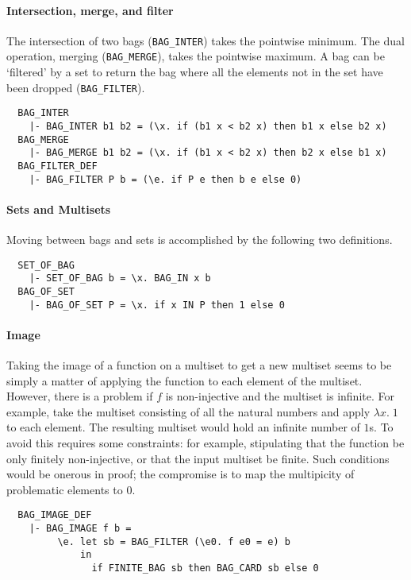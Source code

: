 \paragraph {Intersection, merge, and filter}

The intersection of two bags ({\small\verb+BAG_INTER+}) takes the
pointwise minimum. The dual operation, merging
({\small\verb+BAG_MERGE+}), takes the pointwise maximum. A bag can be
`filtered' by a set to return the bag where all the elements not in
the set have been dropped ({\small\verb+BAG_FILTER+}).
%
{\small
\begin{verbatim}
  BAG_INTER
    |- BAG_INTER b1 b2 = (\x. if (b1 x < b2 x) then b1 x else b2 x)
  BAG_MERGE
    |- BAG_MERGE b1 b2 = (\x. if (b1 x < b2 x) then b2 x else b1 x)
  BAG_FILTER_DEF
    |- BAG_FILTER P b = (\e. if P e then b e else 0)
\end{verbatim}}

\paragraph {Sets and Multisets}

Moving between bags and sets is accomplished by the following two
definitions.
%
{\small
\begin{verbatim}
  SET_OF_BAG
    |- SET_OF_BAG b = \x. BAG_IN x b
  BAG_OF_SET
    |- BAG_OF_SET P = \x. if x IN P then 1 else 0
\end{verbatim}}

\paragraph {Image}

Taking the image of a function on a multiset
to get a new multiset seems to be simply a
matter of applying the function to each element of the multiset. However, there
is a problem if $f$ is non-injective and the multiset is infinite. For
example, take the multiset consisting of all the natural numbers and
apply $\lambda x.\; 1$ to each element. The resulting multiset would hold an
infinite number of $1$s. To avoid this requires some constraints: for
example, stipulating that the function be only finitely non-injective,
or that the input multiset be finite. Such conditions would be onerous
in proof; the compromise is to map the multipicity of problematic
elements to $0$.
%
{\small
\begin{verbatim}
  BAG_IMAGE_DEF
    |- BAG_IMAGE f b =
         \e. let sb = BAG_FILTER (\e0. f e0 = e) b
             in
               if FINITE_BAG sb then BAG_CARD sb else 0
\end{verbatim}}


